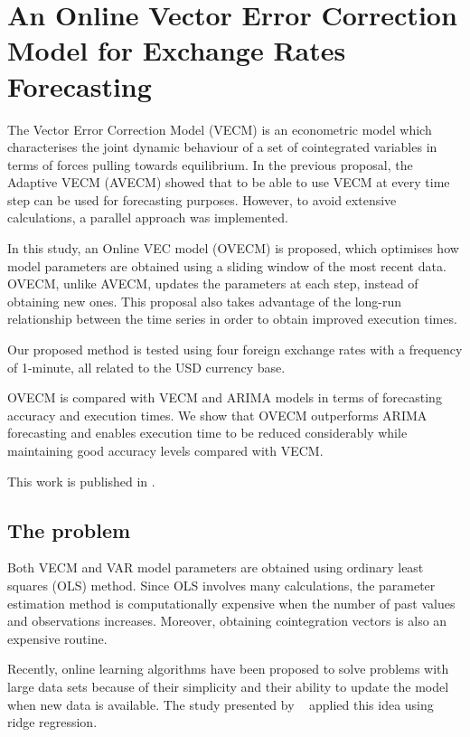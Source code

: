 
\chapter{An Online Vector Error Correction Model for Exchange Rates Forecasting}
\label{chapter:proposal2}

The Vector Error Correction Model (VECM) is an econometric model which
characterises the joint dynamic behaviour of a set of cointegrated variables in
terms of forces pulling towards equilibrium. In the previous proposal, the
Adaptive VECM (AVECM) showed that to be able to use VECM at every time step can
be used for forecasting purposes. However, to avoid extensive calculations, a
parallel approach was implemented.

In this study, an Online VEC model (OVECM) is proposed, which optimises how
model parameters are obtained using a sliding window of the most recent data.
OVECM, unlike AVECM, updates the parameters at each step, instead of obtaining
new ones. This proposal also takes advantage of the long-run relationship
between the time series in order to obtain improved execution times. 

Our proposed method is tested using four foreign exchange rates with a frequency
of 1-minute, all related to the USD currency base. 

OVECM is compared with VECM and ARIMA models in terms of forecasting accuracy
and execution times. We show that OVECM outperforms ARIMA forecasting and
enables execution time to be reduced considerably while maintaining good
accuracy levels compared with VECM.

This work is published in \cite{icpram15}.

\vspace{0.5cm} 

\newpage
\section{The problem}

Both VECM and VAR model parameters are obtained using ordinary least squares
(OLS) method. Since OLS involves many calculations, the parameter estimation
method is computationally expensive when the number of past values and
observations increases. Moreover, obtaining cointegration vectors is also an
expensive routine.

Recently, online learning algorithms have been proposed to solve problems with
large data sets because of their simplicity and their ability to update the
model when new data is available. The study presented by ~\cite{arce+salinas2012}
applied this idea using ridge regression.

